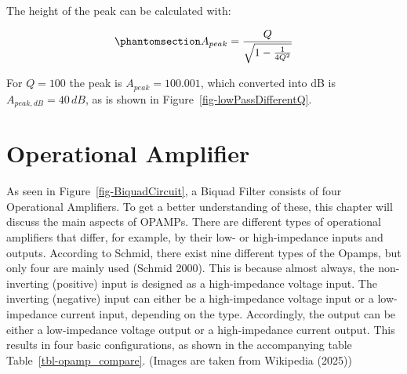 \documentclass[
  letterpaper,
]{scrbook}
\begin{document}
The height of the peak can be calculated with:

\begin{equation}\phantomsection\label{eq-calculatePeak}{
A_{peak} = \frac{Q}{\sqrt{1 - \frac{1}{4Q^2}}}
}\end{equation}

For \(Q = 100\) the peak is \(A_{peak} = 100.001\), which converted into
dB is \(A_{peak,dB} = 40\,dB\), as is shown in
Figure~\ref{fig-lowPassDifferentQ}.

\section{Operational Amplifier}\label{operational-amplifier}

As seen in Figure~\ref{fig-BiquadCircuit}, a Biquad Filter consists of
four Operational Amplifiers. To get a better understanding of these,
this chapter will discuss the main aspects of OPAMPs. There are
different types of operational amplifiers that differ, for example, by
their low- or high-impedance inputs and outputs. According to Schmid,
there exist nine different types of the Opamps, but only four are mainly
used (Schmid 2000). This is because almost always, the non-inverting
(positive) input is designed as a high-impedance voltage input. The
inverting (negative) input can either be a high-impedance voltage input
or a low-impedance current input, depending on the type. Accordingly,
the output can be either a low-impedance voltage output or a
high-impedance current output. This results in four basic
configurations, as shown in the accompanying table
Table~\ref{tbl-opamp_compare}. (Images are taken from Wikipedia (2025))
\end{document}
